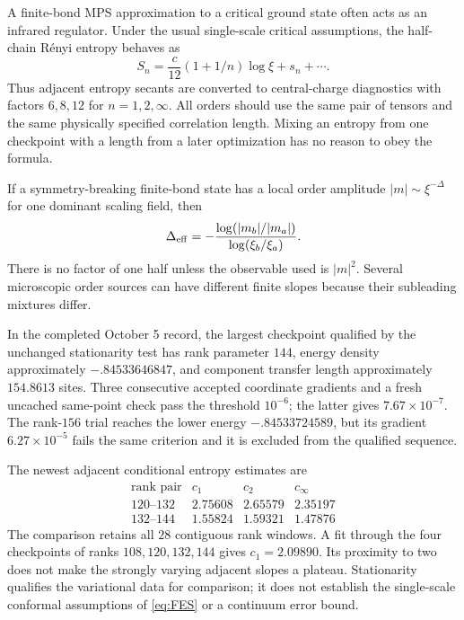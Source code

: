 A finite-bond MPS approximation to a critical ground state often acts
as an infrared regulator. Under the usual single-scale critical
assumptions, the half-chain Rényi entropy behaves as
\begin{equation}
 S_n=\frac c{12}(1+1/n)\log\xi+s_n+\cdots.
 \label{eq:FES}
\end{equation}
Thus adjacent entropy secants are converted to central-charge
diagnostics with factors $6,8,12$ for $n=1,2,\infty$. All orders
should use the same pair of tensors and the same physically specified
correlation length. Mixing an entropy from one checkpoint with a
length from a later optimization has no reason to obey the formula.

If a symmetry-breaking finite-bond state has a local order amplitude
$|m|\sim\xi^{-\Delta}$ for one dominant scaling field, then
\[
 \Delta_{\rm eff}
 =-\frac{\log(|m_b|/|m_a|)}{\log(\xi_b/\xi_a)}.
\]
There is no factor of one half unless the observable used is
$|m|^2$. Several microscopic order sources can have different finite
slopes because their subleading mixtures differ.

\begin{numericalrecord}
In the completed October 5 record, the largest checkpoint qualified
by the unchanged stationarity test has rank parameter $144$,
energy density approximately $-.84533646847$, and component
transfer length approximately $154.8613$ sites.
Three consecutive accepted coordinate gradients and a fresh uncached
same-point check pass the threshold $10^{-6}$; the latter gives
$7.67\times10^{-7}$. The rank-$156$ trial reaches the lower energy
$-.84533724589$, but its gradient $6.27\times10^{-5}$ fails the
same criterion and it is excluded from the qualified sequence.

The newest adjacent conditional entropy estimates are
\[
 \begin{array}{c|ccc}
 \text{rank pair}&c_1&c_2&c_\infty\\ \hline
 120\text{--}132&2.75608&2.65579&2.35197\\
 132\text{--}144&1.55824&1.59321&1.47876
 \end{array}
\]
The comparison retains all $28$ contiguous rank windows.
A fit through the four checkpoints of ranks $108,120,132,144$
gives $c_1=2.09890$. Its proximity to two does not make the
strongly varying adjacent slopes a plateau. Stationarity
qualifies the variational data for comparison; it does not
establish the single-scale conformal assumptions of
\eqref{eq:FES} or a continuum error bound.
\end{numericalrecord}

